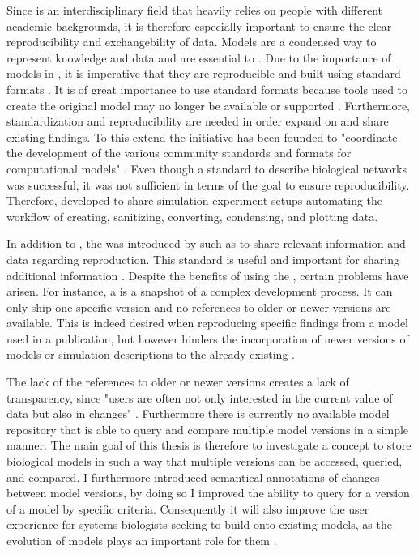 Since \sysbio is an interdisciplinary field that heavily relies on people with different academic backgrounds, it is therefore especially important to ensure the clear reproducibility and exchangebility of data.
Models are a condensed way to represent knowledge and data and are essential to \sysbio.
Due to the importance of models in \sysbio, it is imperative that they are reproducible and built using standard formats \citep{Drager2014}.
It is of great importance to use standard formats because tools used to create the original model may no longer be available or supported \citep{Peng2011}.
Furthermore, standardization and reproducibility are needed in order expand on and share existing findings.
To this extend the \combine initiative has been founded to "coordinate the development of the various community standards and formats for computational models" \citep{COMBINE}.
Even though a standard to describe biological networks was successful, it was not sufficient in terms of the goal to ensure reproducibility. Therefore, \citeauthor{Waltemath2011a} developed \sedml \citep{Waltemath2011a} to share simulation experiment setups automating the workflow of creating, sanitizing, converting, condensing, and plotting data.

In addition to \sedml, the \ca was introduced by \citet{Bergmann2014a} such as to share relevant information and data regarding reproduction. This standard is useful and important for sharing additional information \citep{Bergmann2014a}. %
Despite the benefits of using the \ca, certain problems have arisen. For instance, a \ca is a snapshot of a complex development process. It can only ship one specific version and no references to older or newer versions are available. This is indeed desired when reproducing specific findings from a model used in a publication, but however hinders the incorporation of newer versions of models or simulation descriptions to the already existing .

The lack of the references to older or newer versions creates a lack of transparency, since "users are often not only interested in the current value of data but also in changes" \citep{Cobena2002}. Furthermore there is currently no available model repository that is able to query and compare multiple model versions in a simple manner.
The main goal of this thesis is therefore to investigate a concept to store biological models in such a way that multiple versions can be accessed, queried, and compared. I furthermore introduced semantical annotations of changes between model versions, by doing so I improved the ability to query for a version of a model by specific criteria. Consequently it will also improve the user experience for systems biologists seeking to build onto existing models, as the evolution of models plays an important role for them \citep{Scharm2015}.

